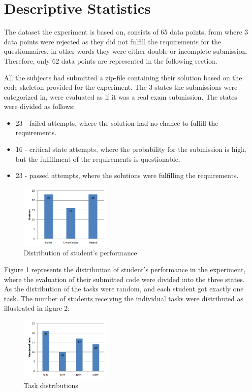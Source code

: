 \documentclass{sig-alternate-05-2015}
\begin{document}
\section{Descriptive Statistics}
The dataset the experiment is based on, consists of 65 data points, from where 3 data points were rejected as they did not fulfill the requirements for the questionnaires, in other words they were either double or incomplete submission. Therefore, only 62 data points are represented in the following section.

All the subjects had submitted a zip-file containing their solution based on the code skeleton provided for the experiment. The 3 states the submissions were categorized in, were evaluated as if it was a real exam submission.
The states were divided as follows:

\begin{itemize}
	\item 23 - failed attempts, where the solution had no chance to fulfill the requirements.
	\item 16 - critical state attempts, where the probability for the submission is high, but the fulfillment of the requirements is questionable.
	\item 23 - passed attempts, where the solutions were fulfilling the requirements.
\end{itemize}

\begin{figure}[H]
	\centering
	\includegraphics[width=0.4\textwidth]{img01}
	\caption{Distribution of student's performance}
\end{figure}

Figure 1 represents the distribution of student's performance in the experiment, where the evaluation of their submitted code were divided into the three states.\\

As the distribution of the tasks were random, and each student got exactly one task. The number of students receiving the individual tasks were distributed as illustrated in figure 2:

\begin{figure}[H]
	\centering
	\includegraphics[width=0.4\textwidth]{img02}
	\caption{Task distributions}
\end{figure}
\end{document}
